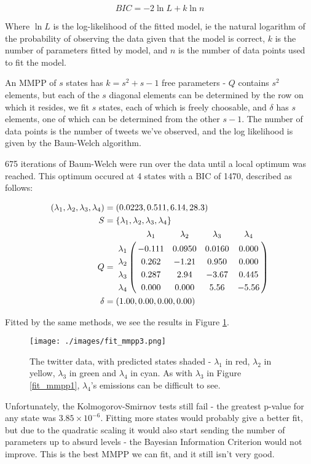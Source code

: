 $$
BIC = -2 \ln L + k \ln n
$$

Where $\ln L$ is the log-likelihood of the fitted model, ie the natural logarithm of the probability of observing the data given that the model is correct, $k$ is the number of parameters fitted by model, and $n$ is the number of data points used to fit the model.

An MMPP of $s$ states has $k=s^2+s-1$ free parameters - $Q$ contains $s^2$ elements, but each of the $s$ diagonal elements can be determined by the row on which it resides, we fit $s$ states, each of which is freely choosable, and $\delta$ has $s$ elements, one of which can be determined from the other $s-1$. The number of data points is the number of tweets we've observed, and the log likelihood is given by the Baun-Welch algorithm.

675 iterations of Baum-Welch were run over the data until a local optimum was reached. This optimum occured at 4 states with a BIC of 1470, described as follows:

\begin{align*}
(\lambda_1,\lambda_2,\lambda_3,\lambda_4) &= (0.0223,0.511,6.14,28.3)\\
S &= \{\lambda_1,\lambda_2,\lambda_3,\lambda_4\}\\
Q &= \bordermatrix{      & \lambda_1 & \lambda_2 & \lambda_3 & \lambda_4\cr
                \lambda_1 & -0.111 & 0.0950 & 0.0160 & 0.000 \cr
                \lambda_2 & 0.262  & -1.21  & 0.950  & 0.000 \cr
                \lambda_3 & 0.287  & 2.94   & -3.67  & 0.445 \cr
                \lambda_4 & 0.000  & 0.000  & 5.56   & -5.56 \cr
			}\\
\delta &= (1.00,0.00,0.00,0.00)
\end{align*}

Fitted by the same methods, we see the results in Figure \ref{fit_mmpp3}.

\begin{figure}[h!]
\texttt{[image: ./images/fit\_mmpp3.png]}
\caption{The twitter data, with predicted states shaded - $\lambda_1$ in red, $\lambda_2$ in yellow, $\lambda_3$ in green and $\lambda_4$ in cyan. As with $\lambda_3$ in Figure \ref{fit_mmpp1}, $\lambda_4$'s emissions can be difficult to see.}
\label{fit_mmpp3}
\end{figure}

Unfortunately, the Kolmogorov-Smirnov tests still fail - the greatest p-value for any state was $3.85 \times 10^{-6}$. Fitting more states would probably give a better fit, but due to the quadratic scaling it would also start sending the number of parameters up to absurd levels - the Bayesian Information Criterion would not improve. This is the best MMPP we can fit, and it still isn't very good.


